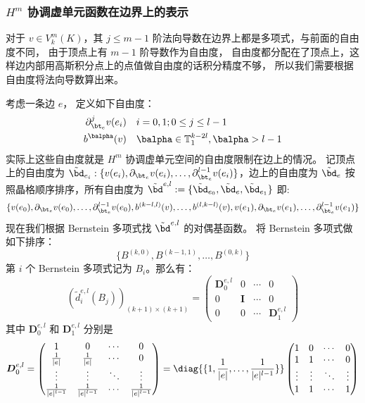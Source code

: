 \subsubsection{$H^m$ 协调虚单元函数在边界上的表示}
对于 $v \in V_k^m(K)$，其 $j\leq m-1$
阶法向导数在边界上都是多项式，与前面的自由度不同，
由于顶点上有 $m-1$ 阶导数作为自由度，
自由度都分配在了顶点上，这样边内部用高斯积分点上的点值做自由度的话积分精度不够，
所以我们需要根据自由度将法向导数算出来。

考虑一条边 $e$， 定义如下自由度：
$$
\begin{aligned}
    \partial_{\bt_e}^{j}v(e_i) & \quad i = 0, 1; 0\leq j \leq l-1\\
b^{\balpha}(v) & \quad \balpha \in \mathbb{T}_{1}^{k-2l}, \balpha > l-1 
\end{aligned}
$$
实际上这些自由度就是 $H^m$ 协调虚单元空间的自由度限制在边上的情况。
记顶点上的自由度为 $\tilde{\bd}_{e_i} : \{v(e_i), \partial_{\bt_e}v(e_i),
\ldots, \partial_{\bt_e}^{l-1}v(e_i)\}$，边上的自由度为 $\tilde{\bd}_e$
按照晶格顺序排序，所有自由度为 $\tilde{\bd}^{e, l} := \{\tilde{\bd}_{e_0}, \tilde{\bd}_e,
\tilde{\bd}_{e_1}\}$ 即: 
$$
\{v(e_0), \partial_{\bt_e}v(e_0), \ldots, \partial_{\bt_e}^{l-1}v(e_0),
    b^{(k-l, l)}(v), \ldots, b^{(l, k-l)}(v), v(e_1), \partial_{\bt_e}v(e_1),
\ldots, \partial_{\bt_e}^{l-1}v(e_1)\}
$$
现在我们根据 Bernstein 多项式找 $\tilde{\bd}^{e, l}$ 的对偶基函数。
将 Bernstein 多项式做如下排序：
$$
\{B^{(k, 0)}, B^{(k-1, 1)}, \ldots, B^{(0, k)}\}
$$
第 $i$ 个 Bernstein 多项式记为 $B_i$。那么有：
$$
(\tilde{d}^{e, l}_i(B_j))_{(k+1)\times (k+1)} = 
\begin{pmatrix}
    \boldsymbol{D}_0^{e, l} & 0 & \cdots & 0\\
    0 & \boldsymbol{I} & \cdots & 0\\
    0 & 0 & \cdots & \boldsymbol{D}_1^{e, l}
\end{pmatrix}
$$
其中 $\boldsymbol{D}_0^{e, l}$ 和 $\boldsymbol{D}_1^{e, l}$ 分别是
$$
\boldsymbol{D}^{e, l}_0 = \begin{pmatrix}
    1 & 0 & \cdots & 0\\
    \frac{1}{|e|} & \frac{1}{|e|} & \cdots & 0\\
    \vdots & \vdots & \ddots & \vdots\\
    \frac{1}{|e|^{l-1}} & \frac{1}{|e|^{l-1}} & \cdots & \frac{1}{|e|^{l-1}}
\end{pmatrix}
= 
\diag{\{1, \frac{1}{|e|}, \ldots, \frac{1}{|e|^{l-1}}\}}
\begin{pmatrix}
    1 & 0 & \cdots & 0\\
    1 & 1 & \cdots & 0\\
    \vdots & \vdots & \ddots & \vdots\\
    1 & 1 & \cdots & 1
\end{pmatrix}
$$
